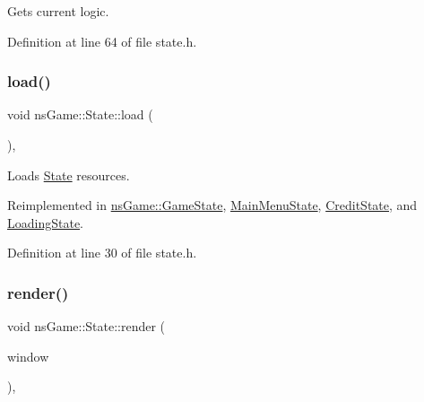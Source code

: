Gets current logic. 



Definition at line 64 of file state.\+h.

\mbox{\label{classns_game_1_1_state_a8644de505f7a84933f6d6e6651205791}} 
\subsubsection{\texorpdfstring{load()}{load()}}
{\footnotesize\ttfamily void ns\+Game\+::\+State\+::load (\begin{DoxyParamCaption}{ }\end{DoxyParamCaption})\hspace{0.3cm}{\ttfamily [inline]}, {\ttfamily [virtual]}}



Loads \hyperlink{classns_game_1_1_state}{State} resources. 



Reimplemented in \hyperlink{classns_game_1_1_game_state_a66f7b8027a33f473fd22c212700586f2}{ns\+Game\+::\+Game\+State}, \hyperlink{class_main_menu_state_a723f41a3c34138c5c5f7dcafc076718e}{Main\+Menu\+State}, \hyperlink{class_credit_state_a32ec8ae5c12ee636cfd2b949b8e980e1}{Credit\+State}, and \hyperlink{class_loading_state_a66c29bb02cb85fbc522040dc23739118}{Loading\+State}.



Definition at line 30 of file state.\+h.

\mbox{\label{classns_game_1_1_state_a214f8ee52de4b318f1ed3861a578ce67}} 
\subsubsection{\texorpdfstring{render()}{render()}}
{\footnotesize\ttfamily void ns\+Game\+::\+State\+::render (\begin{DoxyParamCaption}\item[{Min\+GL \&}]{window }\end{DoxyParamCaption})\hspace{0.3cm}{\ttfamily [inline]}, {\ttfamily [virtual]}}



